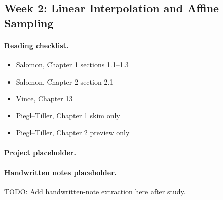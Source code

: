 \subsection{Week 2: Linear Interpolation and Affine Sampling}

\paragraph{Reading checklist.}
\begin{itemize}
  \item Salomon, Chapter 1 sections 1.1--1.3
  \item Salomon, Chapter 2 section 2.1
  \item Vince, Chapter 13
  \item Piegl--Tiller, Chapter 1 skim only
  \item Piegl--Tiller, Chapter 2 preview only
\end{itemize}

\paragraph{Project placeholder.}
\begingroup\small
{}
\endgroup

\paragraph{Handwritten notes placeholder.}
TODO: Add handwritten-note extraction here after study.
